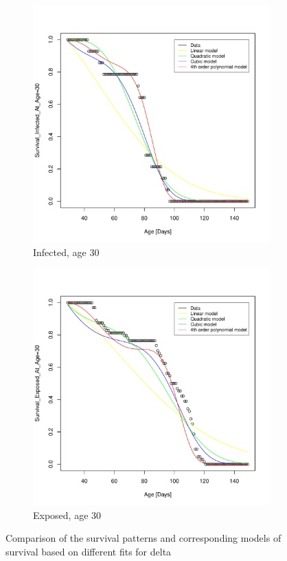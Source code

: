 \documentclass[10pt]{article}         %
\begin{document}
\begin{figure}[!ht]
\begin{subfigure}[b]{0.6\textwidth}
    \includegraphics[width=\textwidth]{Fitting_delta_inf_at_age_30.pdf}
    \caption{Infected, age 30}
    \label{fig:subfigure_5}
  \end{subfigure}
  \begin{subfigure}[b]{0.6\textwidth}
    \includegraphics[width=\textwidth]{Fitting_delta_exp_at_age_30.pdf}
    \caption{Exposed, age 30}
    \label{fig:subfigure_6}
  \end{subfigure}  
  
\caption{Comparison of the survival patterns and corresponding models of survival based on different fits for delta}
	\label{fig:survival_ages_5_15_30}
\end{figure}
\end{document}
